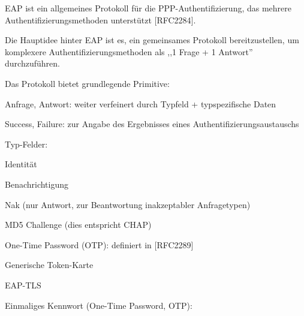 \documentclass[a4paper]{article}
\begin{document}
\begin{multicols}{3}
\begin{itemize*}
            \begin{itemize*}
                  \item EAP ist ein allgemeines Protokoll für die PPP-Authentifizierung, das mehrere Authentifizierungsmethoden unterstützt {[}RFC2284{]}.
                  \item Die Hauptidee hinter EAP ist es, ein gemeinsames Protokoll bereitzustellen, um komplexere Authentifizierungsmethoden als ,,1 Frage + 1 Antwort'' durchzuführen.
                  \item Das Protokoll bietet grundlegende Primitive:
                  \begin{itemize*} \item Anfrage, Antwort: weiter verfeinert durch Typfeld + typspezifische Daten \item Success, Failure: zur Angabe des Ergebnisses eines Authentifizierungsaustauschs \end{itemize*}
                  \item Typ-Felder:
                  \begin{itemize*} \item Identität \item Benachrichtigung \item Nak (nur Antwort, zur Beantwortung inakzeptabler Anfragetypen) \item MD5 Challenge (dies entspricht CHAP) \item One-Time Password (OTP): definiert in {[}RFC2289{]} \item Generische Token-Karte \item EAP-TLS \end{itemize*}
            \end{itemize*}
            \item
            Einmaliges Kennwort (One-Time Password, OTP):


\end{itemize*}
\end{multicols}
\end{document}
